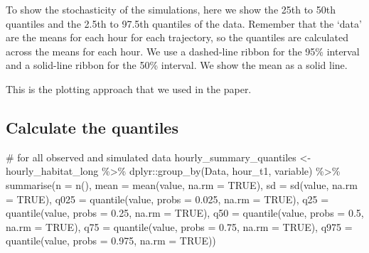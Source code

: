 \documentclass[
  letterpaper,
  DIV=11,
  numbers=noendperiod]{scrartcl}
\newenvironment{Shaded}{\begin{snugshade}}{\end{snugshade}}
\newcommand{\AttributeTok}[1]{\textcolor[rgb]{0.40,0.45,0.13}{#1}}
\newcommand{\CommentTok}[1]{\textcolor[rgb]{0.37,0.37,0.37}{#1}}
\newcommand{\ConstantTok}[1]{\textcolor[rgb]{0.56,0.35,0.01}{#1}}
\newcommand{\FloatTok}[1]{\textcolor[rgb]{0.68,0.00,0.00}{#1}}
\newcommand{\FunctionTok}[1]{\textcolor[rgb]{0.28,0.35,0.67}{#1}}
\newcommand{\NormalTok}[1]{\textcolor[rgb]{0.00,0.23,0.31}{#1}}
\newcommand{\OtherTok}[1]{\textcolor[rgb]{0.00,0.23,0.31}{#1}}
\newcommand{\SpecialCharTok}[1]{\textcolor[rgb]{0.37,0.37,0.37}{#1}}
\begin{document}
To show the stochasticity of the simulations, here we show the 25th to
50th quantiles and the 2.5th to 97.5th quantiles of the data. Remember
that the `data' are the means for each hour for each trajectory, so the
quantiles are calculated across the means for each hour. We use a
dashed-line ribbon for the 95\% interval and a solid-line ribbon for the
50\% interval. We show the mean as a solid line.

This is the plotting approach that we used in the paper.

\subsection{Calculate the quantiles}\label{calculate-the-quantiles}

\begin{Shaded}
\begin{Highlighting}[]
\CommentTok{\# for all observed and simulated data}
\NormalTok{hourly\_summary\_quantiles }\OtherTok{\textless{}{-}}\NormalTok{ hourly\_habitat\_long }\SpecialCharTok{\%\textgreater{}\%} 
\NormalTok{  dplyr}\SpecialCharTok{::}\FunctionTok{group\_by}\NormalTok{(Data, hour\_t1, variable) }\SpecialCharTok{\%\textgreater{}\%} 
  \FunctionTok{summarise}\NormalTok{(}\AttributeTok{n =} \FunctionTok{n}\NormalTok{(), }
            \AttributeTok{mean =} \FunctionTok{mean}\NormalTok{(value, }\AttributeTok{na.rm =} \ConstantTok{TRUE}\NormalTok{),}
            \AttributeTok{sd =} \FunctionTok{sd}\NormalTok{(value, }\AttributeTok{na.rm =} \ConstantTok{TRUE}\NormalTok{),}
            \AttributeTok{q025 =} \FunctionTok{quantile}\NormalTok{(value, }\AttributeTok{probs =} \FloatTok{0.025}\NormalTok{, }\AttributeTok{na.rm =} \ConstantTok{TRUE}\NormalTok{), }
            \AttributeTok{q25 =} \FunctionTok{quantile}\NormalTok{(value, }\AttributeTok{probs =} \FloatTok{0.25}\NormalTok{, }\AttributeTok{na.rm =} \ConstantTok{TRUE}\NormalTok{),}
            \AttributeTok{q50 =} \FunctionTok{quantile}\NormalTok{(value, }\AttributeTok{probs =} \FloatTok{0.5}\NormalTok{, }\AttributeTok{na.rm =} \ConstantTok{TRUE}\NormalTok{), }
            \AttributeTok{q75 =} \FunctionTok{quantile}\NormalTok{(value, }\AttributeTok{probs =} \FloatTok{0.75}\NormalTok{, }\AttributeTok{na.rm =} \ConstantTok{TRUE}\NormalTok{),}
            \AttributeTok{q975 =} \FunctionTok{quantile}\NormalTok{(value, }\AttributeTok{probs =} \FloatTok{0.975}\NormalTok{, }\AttributeTok{na.rm =} \ConstantTok{TRUE}\NormalTok{))}
\end{Highlighting}
\end{Shaded}
\end{document}
